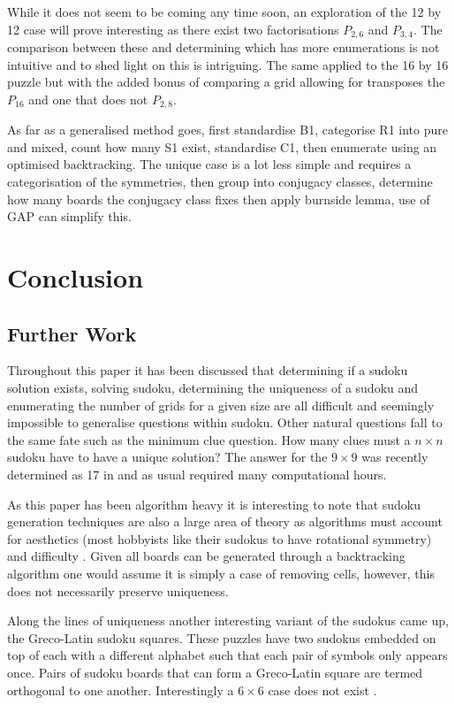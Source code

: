 \documentclass[a4paper,11pt]{report}
\begin{document}
While it does not seem to be coming any time soon, an exploration of the 12 by 12 case will prove interesting as there exist two factorisations $P_{2,6}$ and $P_{3,4}$. The comparison between these and determining which has more enumerations is not intuitive and to shed light on this is intriguing. The same applied to the 16 by 16 puzzle but with the added bonus of comparing a grid allowing for transposes the $P_{16}$ and one that does not $P_{2,8}$.

As far as a generalised method goes, first standardise B1, categorise R1 into pure and mixed, count how many S1 exist, standardise C1, then enumerate using an optimised backtracking. The unique case is a lot less simple and requires a categorisation of the symmetries, then group into conjugacy classes, determine how many boards the conjugacy class fixes then apply burnside lemma, use of GAP can simplify this.

\chapter{Conclusion}
\section{Further Work}

Throughout this paper it has been discussed that determining if a sudoku solution exists, solving sudoku, determining the uniqueness of a sudoku and enumerating the number of grids for a given size are all difficult and seemingly impossible to generalise questions within sudoku. Other natural questions fall to the same fate such as the minimum clue question. How many clues must a $n\times n$ sudoku have to have a unique solution? The answer for the $9\times 9$ was recently determined as 17 in \cite{mcguire2014there} and as usual required many computational hours.

As this paper has been algorithm heavy it is interesting to note that sudoku generation techniques are also a large area of theory as algorithms must account for aesthetics (most hobbyists like their sudokus to have rotational symmetry) and difficulty \cite{maji2016comprehensive}. Given all boards can be generated through a backtracking algorithm one would assume it is simply a case of removing cells, however, this does not necessarily preserve uniqueness.

Along the lines of uniqueness another interesting variant of the sudokus came up, the Greco-Latin sudoku squares. These puzzles have two sudokus embedded on top of each with a different alphabet such that each pair of symbols only appears once. Pairs of sudoku boards that can form a Greco-Latin square are termed orthogonal to one another. Interestingly a $6\times 6$ case does not exist \cite{tarry1900probleme}.
\end{document}
